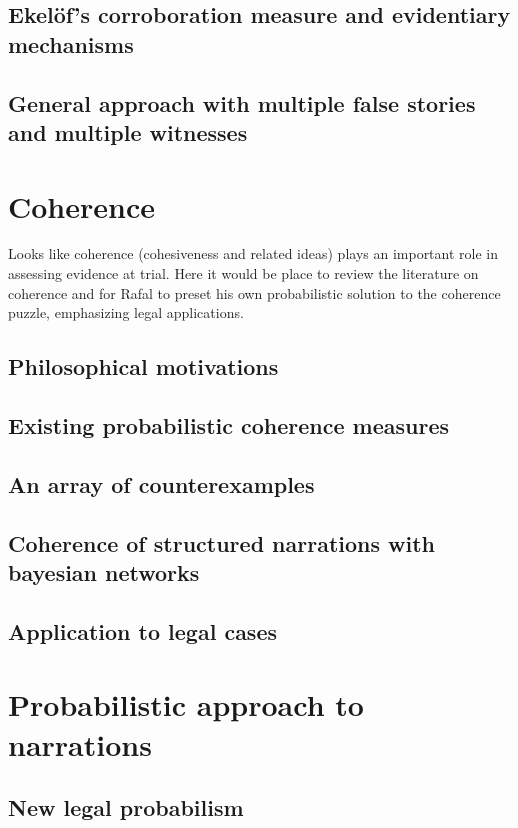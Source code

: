 \documentclass[]{book}
\begin{document}
\section{Ekel\"of's corroboration measure and evidentiary mechanisms}

\section{General approach  with multiple false stories and multiple witnesses}

\chapter{Coherence}

Looks like coherence (cohesiveness and related ideas)
plays an important role in assessing evidence at trial.
Here it would be place to review the literature on coherence
and for Rafal to preset his
own probabilistic solution to the coherence puzzle,
emphasizing legal applications.

\section{Philosophical motivations}

\section{Existing probabilistic coherence measures}

\section{An array of counterexamples}

\section{Coherence of structured narrations with bayesian networks}

\section{Application to legal cases}

\chapter{Probabilistic approach to narrations}

\section{New legal probabilism}
\end{document}
